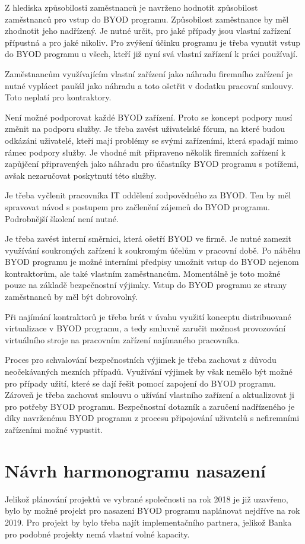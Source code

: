Z hlediska způsobilosti zaměstnanců je navrženo hodnotit způsobilost zaměstnanců pro vstup do BYOD programu. Způsobilost zaměstnance by měl zhodnotit jeho nadřízený. Je nutné určit, pro jaké případy jsou vlastní zařízení přípustná a pro jaké nikoliv. Pro zvýšení účinku programu je třeba vynutit vstup do BYOD programu u všech, kteří již nyní svá vlastní zařízení k práci používají.

Zaměstnancům využívajícím vlastní zařízení jako náhradu firemního zařízení je nutné vyplácet paušál jako náhradu a toto ošetřit v dodatku pracovní smlouvy. Toto neplatí pro kontraktory.


Není možné podporovat každé BYOD zařízení. Proto se koncept podpory musí změnit na podporu služby. Je třeba zavést uživatelské fórum, na které budou odkázáni uživatelé, kteří mají problémy se svými zařízeními, která spadají mimo rámec podpory služby. Je vhodné mít připraveno několik firemních zařízení k zapůjčení připravených jako náhradu pro účastníky BYOD programu s potížemi, avšak nezaručovat poskytnutí této služby.

Je třeba vyčlenit pracovníka IT oddělení zodpovědného za BYOD. Ten by měl spravovat návod s postupem pro začlenění zájemců do BYOD programu. Podrobnější školení není nutné.


Je třeba zavést interní směrnici, která ošetří BYOD ve firmě. Je nutné zamezit využívání soukromých zařízení k soukromým účelům v pracovní době. Po náběhu BYOD programu je možné interními předpisy umožnit vstup do BYOD nejenom kontraktorům, ale také vlastním zaměstnancům. Momentálně je toto možné pouze na základě bezpečnostní výjimky. Vstup do BYOD programu ze strany zaměstnanců by měl být dobrovolný. 

Při najímání kontraktorů je třeba brát v úvahu využití konceptu distribuované virtualizace v BYOD programu, a tedy smluvně zaručit možnost provozování virtuálního stroje na pracovním zařízení najímaného pracovníka.

Proces pro schvalování bezpečnostních výjimek je třeba zachovat z důvodu neočekávaných mezních případů. Využívání výjimek by však nemělo být možné pro případy užití, které se dají řešit pomocí zapojení do BYOD programu. Zároveň je třeba zachovat smlouvu o užívání vlastního zařízení a aktualizovat ji pro potřeby BYOD programu. Bezpečnostní dotazník a zaručení nadřízeného je díky navrženému BYOD programu z procesu připojování uživatelů s nefiremními zařízeními možné vypustit.

\section{Návrh harmonogramu nasazení}
Jelikož plánování projektů ve vybrané společnosti na rok 2018 je již uzavřeno, bylo by možné projekt pro nasazení BYOD programu naplánovat nejdříve na rok 2019. Pro projekt by bylo třeba najít implementačního partnera, jelikož Banka pro podobné projekty nemá vlastní volné kapacity.

